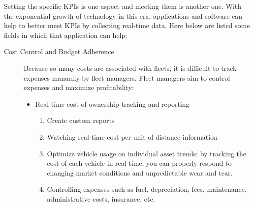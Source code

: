 Setting the specific KPIs is one aspect and meeting them is another one. With the exponential growth of technology in this era, applications and software can help to better meet KPIs by collecting real-time data. Here below are listed some fields in which that application can help:

\begin{description}
    \item [Cost Control and Budget Adherence] Because so many costs are associated with fleets, it is difficult to track expenses manually by fleet managers. Fleet managers aim to control expenses and maximize profitability: 
        \begin{itemize}
            \item Real-time cost of ownership tracking and reporting
                \begin{enumerate}
                    \item Create custom reports
                    \item Watching real-time cost per unit of distance information
                    \item Optimize vehicle usage on individual asset trends: by tracking the cost of each vehicle in real-time, you can properly respond to changing market conditions and unpredictable wear and tear.
                    \item Controlling expenses such as fuel, depreciation, fees, maintenance, administrative costs, insurance, etc. 
                \end{enumerate}
        \end{itemize}
    

\end{description}
